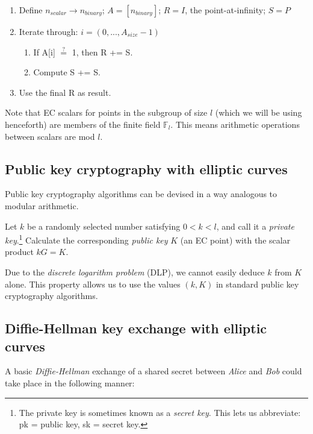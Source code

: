 \begin{enumerate}
	\item Define $n_{scalar} \rightarrow n_{binary}$; $A = [n_{binary}]$; $R = I$, the point-at-infinity; $S = P$
	\item Iterate through: $i = (0,...,A_{size} - 1)$
	\begin{enumerate}
		\item If A[i] $\stackrel{?}{=}$ 1, then R += S.
		\item Compute S += S.
	\end{enumerate}
	\item Use the final R as result.
\end{enumerate}

Note that EC scalars for points in the subgroup of size $l$ (which we will be using henceforth) are members of the finite field $\mathbb{F}_l$. This means arithmetic operations between scalars are mod $l$.


\subsection{Public key cryptography with elliptic curves}
\label{subsec:ec-keys}
Public key cryptography algorithms can be devised in a way analogous to modular arithmetic.

Let \(k\) be a randomly selected number satisfying \(0 < k < l\), and call it a {\em private key}.\footnote{The private key is sometimes known as a {\em secret key}. This lets us abbreviate: pk = public key, sk = secret key.} Calculate the corresponding {\em public key} \(K\) (an EC point) with the scalar product \(k G = K\). 

Due to the {\em discrete logarithm problem} (DLP), we cannot easily deduce \(k\) from \(K\) alone. This property allows us to use the values \((k, K)\) in standard public key cryptography algorithms.


\subsection{Diffie-Hellman key exchange with elliptic curves}
\label{DH_exchange_section}

A basic {\em Diffie-Hellman} \cite{Diffie-Hellman} exchange of a shared secret between {\em Alice} and {\em Bob} could take place in the following manner:

